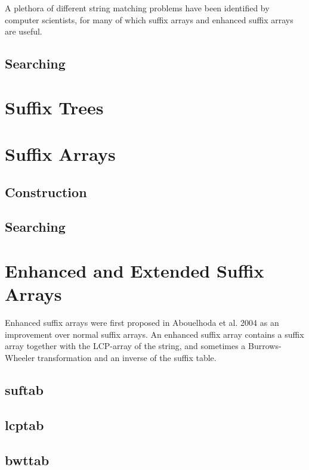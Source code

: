 \documentclass{article}
\begin{document}
A plethora of different string matching problems have been identified
by computer scientists, for many of which suffix arrays and enhanced
suffix arrays are useful.

\subsection*{Searching}




\section*{Suffix Trees}

\section*{Suffix Arrays}

\subsection*{Construction}

\subsection*{Searching}

\section*{Enhanced and Extended Suffix Arrays}

Enhanced suffix arrays were first proposed in Abouelhoda et al. 2004 as an
improvement over normal suffix arrays. An enhanced suffix array contains
a suffix array together with the LCP-array of the string, and sometimes
a Burrows-Wheeler transformation and an inverse of the suffix table.

\subsection*{suftab}

\subsection*{lcptab}

\subsection*{bwttab}
\end{document}
